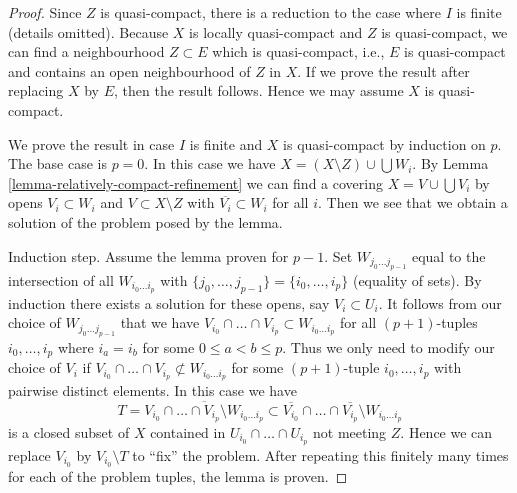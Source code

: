 \begin{proof}
Since $Z$ is quasi-compact, there is a reduction to the
case where $I$ is finite (details omitted).
Because $X$ is locally quasi-compact and $Z$ is quasi-compact,
we can find a neighbourhood $Z \subset E$ which is quasi-compact,
i.e., $E$ is quasi-compact and contains an open neighbourhood
of $Z$ in $X$. If we prove the result after replacing $X$ by $E$,
then the result follows. Hence we may assume $X$ is quasi-compact.

\medskip\noindent
We prove the result in case $I$ is finite and $X$ is quasi-compact
by induction on $p$. The base case is $p = 0$. In this case we have
$X = (X \setminus Z) \cup \bigcup W_i$. By
Lemma \ref{lemma-relatively-compact-refinement}
we can find a covering $X = V \cup \bigcup V_i$ by
opens $V_i \subset W_i$ and $V \subset X \setminus Z$
with $\overline{V_i} \subset W_i$ for all $i$. Then we see that
we obtain a solution of the problem posed by the lemma.

\medskip\noindent
Induction step. Assume the lemma proven for $p - 1$.
Set $W_{j_0 \ldots j_{p - 1}}$ equal to the intersection of
all $W_{i_0 \ldots i_p}$ with
$\{j_0, \ldots, j_{p - 1}\} = \{i_0, \ldots, i_p\}$ (equality of sets).
By induction there exists a solution for these opens, say
$V_i \subset U_i$.
It follows from our choice of $W_{j_0 \ldots j_{p - 1}}$ that we have
$V_{i_0} \cap \ldots \cap V_{i_p} \subset W_{i_0 \ldots i_p}$
for all $(p + 1)$-tuples $i_0, \ldots, i_p$ where $i_a = i_b$ for
some $0 \leq a < b \leq p$.
Thus we only need to modify our choice of
$V_i$ if $V_{i_0} \cap \ldots \cap V_{i_p} \not \subset W_{i_0 \ldots i_p}$
for some $(p + 1)$-tuple $i_0, \ldots, i_p$ with pairwise distinct elements.
In this case we have
$$
T =
\overline{V_{i_0} \cap \ldots \cap V_{i_p} \setminus W_{i_0 \ldots i_p}}
\subset 
\overline{V_{i_0}} \cap \ldots \cap \overline{V_{i_p}} \setminus
W_{i_0 \ldots i_p}
$$
is a closed subset of $X$ contained in $U_{i_0} \cap \ldots \cap U_{i_p}$
not meeting $Z$. Hence we can replace $V_{i_0}$ by $V_{i_0} \setminus T$
to ``fix'' the problem. After repeating this finitely many times for each
of the problem tuples, the lemma is proven.
\end{proof}

